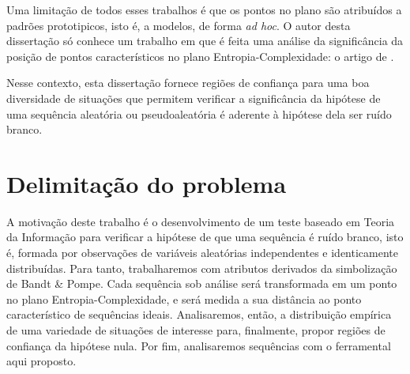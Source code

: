 Uma limitação de todos esses trabalhos é que os pontos no plano são atribuídos a padrões prototipicos, isto é, a modelos, de forma \textit{ad hoc}.
O autor desta dissertação só conhece um trabalho em que é feita uma análise da significância da posição de pontos característicos no plano Entropia-Complexidade: o artigo de \citet{NewPermutationEntropy}.

Nesse contexto, esta dissertação fornece regiões de confiança para uma boa diversidade de situações que permitem verificar a significância da hipótese de uma sequência aleatória ou pseudoaleatória é aderente à hipótese dela ser ruído branco.

\section{Delimitação do problema} %

A motivação deste trabalho é o desenvolvimento de um teste baseado em Teoria da Informação para verificar a hipótese de que uma sequência é ruído branco, isto é, formada por observações de variáveis aleatórias independentes e identicamente distribuídas.
Para tanto, trabalharemos com atributos derivados da simbolização de Bandt \& Pompe.
Cada sequência sob análise será transformada em um ponto no plano Entropia-Complexidade, e será medida a sua distância ao ponto característico de sequências ideais.
Analisaremos, então, a distribuição empírica de uma variedade de situações de interesse para, finalmente, propor regiões de confiança da hipótese nula.
Por fim, analisaremos sequências com o ferramental aqui proposto.
